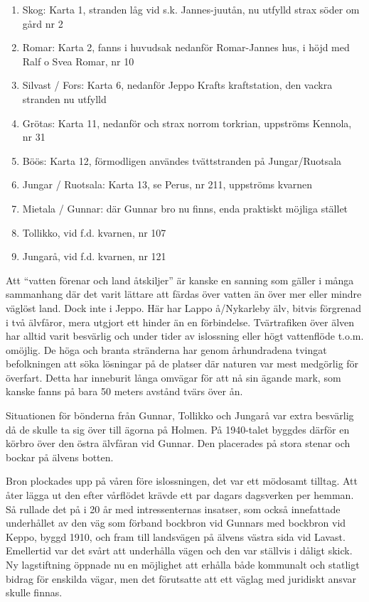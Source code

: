\begin{enumerate}
  \item Skog: Karta 1, stranden låg vid s.k. Jannes-juutån, nu utfylld strax söder om gård nr 2
  \item Romar: Karta 2, fanns i huvudsak nedanför Romar-Jannes hus, i höjd med Ralf o Svea Romar, nr 10
  \item Silvast / Fors: Karta 6, nedanför Jeppo Krafts kraftstation, den vackra stranden nu utfylld
  \item Grötas: Karta 11, nedanför och strax norrom torkrian, uppströms Kennola, nr 31
  \item Böös: Karta 12, förmodligen användes tvättstranden på Jungar/Ruotsala
  \item Jungar / Ruotsala: Karta 13, se Perus, nr 211, uppströms kvarnen
  \item Mietala / Gunnar: där Gunnar bro nu finns, enda praktiskt möjliga stället
  \item Tollikko, vid f.d. kvarnen, nr 107
  \item Jungarå, vid f.d. kvarnen, nr 121
\end{enumerate}


%

Att ``vatten förenar och land åtskiljer'' är kanske en sanning som gäller i många sammanhang där det varit lättare att färdas över vatten än över mer eller mindre väglöst land. Dock inte i Jeppo. Här har Lappo å/Nykarleby älv, bitvis förgrenad i två älvfåror, mera utgjort ett hinder än en förbindelse. Tvärtrafiken över älven har alltid varit besvärlig och under tider av islossning eller högt vattenflöde t.o.m. omöjlig. De höga och branta stränderna har genom århundradena tvingat befolkningen att söka lösningar på de platser där naturen var mest medgörlig för överfart. Detta har inneburit långa omvägar för att nå sin ägande mark, som kanske fanns på bara 50 meters avstånd tvärs över ån.

Situationen för bönderna från Gunnar, Tollikko och Jungarå var extra besvärlig då de skulle ta sig över till ägorna på Holmen. På 1940-talet byggdes därför en körbro över den östra älvfåran vid Gunnar. Den placerades på stora stenar och bockar på älvens botten.

Bron plockades upp på våren före islossningen, det var ett mödosamt tilltag. Att åter lägga ut den efter vårflödet krävde ett par dagars dagsverken per hemman. Så rullade det på i 20 år med intressenternas insatser, som också innefattade underhållet av den väg som förband bockbron vid Gunnars med bockbron vid Keppo, byggd 1910, och fram till landsvägen på älvens västra sida vid Lavast. Emellertid var det svårt att underhålla vägen och den var ställvis i dåligt skick. Ny lagstiftning öppnade nu en möjlighet att erhålla både kommunalt och statligt bidrag för enskilda vägar, men det förutsatte att ett väglag med juridiskt ansvar skulle finnas.

